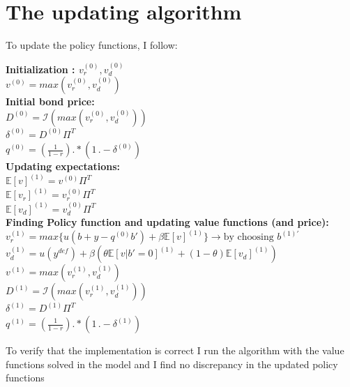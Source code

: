 \documentclass[12pt, a4paper]{article}
\begin{document}
\section{The updating algorithm}
To update the policy functions, I follow: \\
\begin{algorithm}[H]
	\textbf{Initialization : $v_{r}^{(0)}, v_{d}^{(0)}$}\\
		$v^{(0)} = max\left(v_{r}^{(0)}, v_{d}^{(0)}\right)$ \\
	\textbf{Initial bond price:} \\
	$D^{(0)} = \mathcal{I} \left(max\left(v_{r}^{(0)}, v_{d}^{(0)}\right)\right)$\\
	$\delta^{(0)} = D^{(0)} \Pi^T$\\
	$q^{(0)} = \left(\frac{1}{1-r}\right) .* (1 \, .- \delta^{(0)})$ \\
	\textbf{Updating expectations:} \\
	$\mathbb{E}[v]^{(1)} = v^{(0)} \Pi^T$\\
	$\mathbb{E}[v_{r}]^{(1)} = v^{(0)}_{r} \Pi^T$\\
	$\mathbb{E}[v_{d}]^{(1)} = v^{(0)}_{d} \Pi^T$\\
	\textbf{Finding Policy function and updating value functions (and price):} \\
	$v_r^{(1)} = max\{ u(b+y - q^{(0)}b') + \beta\mathbb{E}[v]^{(1)} \} \rightarrow \text{by choosing } b^{(1)'}$ \\
	$v_d^{(1)} = u(y^{def}) + \beta(\theta \mathbb{E}[v| b'=0]^{(1)} + (1-\theta)\mathbb{E}[v_d]^{(1)})$\\
	$v^{(1)} = max\left(v_{r}^{(1)}, v_{d}^{(1)}\right)$ \\
	$D^{(1)} = \mathcal{I} \left(max\left(v_{r}^{(1)}, v_{d}^{(1)}\right)\right)$\\
	$\delta^{(1)} = D^{(1)} \Pi^T$\\
	$q^{(1)} = \left(\frac{1}{1-r}\right) .* (1 \, .- \delta^{(1)})$ \\
\end{algorithm}
To verify that the implementation is correct I run the algorithm with the value functions solved in the model and I find no discrepancy in the updated policy functions\\
\end{document}
